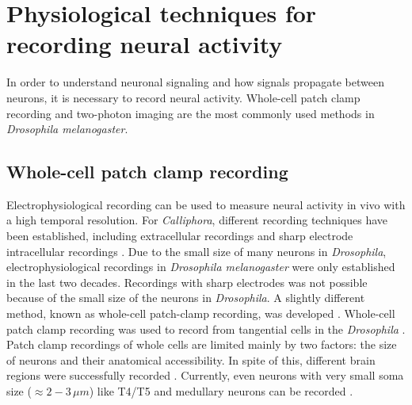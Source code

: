 \section{Physiological techniques for recording neural activity}
In order to understand neuronal signaling and how signals propagate between neurons, it is necessary to record neural activity. Whole-cell patch clamp recording and two-photon imaging are the most commonly used methods in \textit{Drosophila melanogaster}.

\subsection{Whole-cell patch clamp recording}
Electrophysiological recording can be used to measure neural activity in vivo with a high temporal resolution. For \textit{Calliphora}, different recording techniques have been established, including extracellular recordings and sharp electrode intracellular recordings \parencite{Haag2001, Laughlin1989, Bishop1967}. Due to the small size of many neurons in \textit{Drosophila}, electrophysiological recordings in \textit{Drosophila melanogaster} were only established in the last two decades. Recordings with sharp electrodes was not possible because of the small size of the neurons in \textit{Drosophila}. A slightly different method, known as whole-cell patch-clamp recording, was developed \parencite{Sakmann1984}. Whole-cell patch clamp recording was used to record from tangential cells in the \textit{Drosophila} \parencite{ Joesch2008}. Patch clamp recordings of whole cells are limited mainly by two factors: the size of neurons and their anatomical accessibility. In spite of this, different brain regions were successfully recorded \parencite{Behnia2014, Murthy2008, Wilson2004}. Currently, even neurons with very small soma size ($\approx 2-3 \, \mu m$) like T4/T5 and medullary neurons can be recorded \parencite{Gruntman2018, Groschner2022}.

